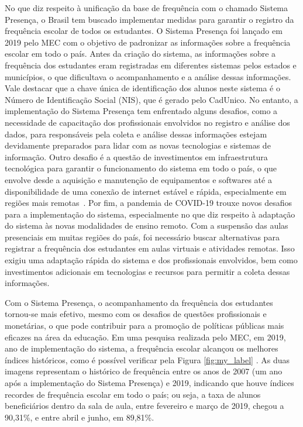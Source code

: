 No que diz respeito à unificação da base de frequência com o chamado Sistema Presença, o Brasil tem buscado implementar medidas para garantir o registro da frequência escolar de todos os estudantes. O Sistema Presença foi lançado em 2019 pelo MEC com o objetivo de padronizar as informações sobre a frequência escolar em todo o país. Antes da criação do sistema, as informações sobre a frequência dos estudantes eram registradas em diferentes sistemas pelos estados e municípios, o que dificultava o acompanhamento e a análise dessas informações. Vale destacar que a chave única de identificação dos alunos neste sistema é o Número de Identificação Social (NIS), que é gerado pelo CadUnico. No entanto, a implementação do Sistema Presença tem enfrentado alguns desafios, como a necessidade de capacitação dos profissionais envolvidos no registro e análise dos dados, para responsáveis pela coleta e análise dessas informações estejam devidamente preparados para lidar com as novas tecnologias e sistemas de informação. Outro desafio é a questão de investimentos em infraestrutura tecnológica para garantir o funcionamento do sistema em todo o país, o que envolve desde a aquisição e manutenção de equipamentos e softwares até a disponibilidade de uma conexão de internet estável e rápida, especialmente em regiões mais remotas~\cite{echazarra2019learning}. Por fim, a pandemia de COVID-19 trouxe novos desafios para a implementação do sistema, especialmente no que diz respeito à adaptação do sistema às novas modalidades de ensino remoto. Com a suspensão das aulas presenciais em muitas regiões do país, foi necessário buscar alternativas para registrar a frequência dos estudantes em aulas virtuais e atividades remotas. Isso exigiu uma adaptação rápida do sistema e dos profissionais envolvidos, bem como investimentos adicionais em tecnologias e recursos para permitir a coleta dessas informações.

Com o Sistema Presença, o acompanhamento da frequência dos estudantes tornou-se mais efetivo, mesmo com os desafios de questões profissionais e monetárias, o que pode contribuir para a promoção de políticas públicas mais eficazes na área da educação. Em uma pesquisa realizada pelo MEC, em 2019, ano de implementação do sistema, a frequência escolar alcançou os melhores índices históricos, como é possível verificar pela Figura \ref{fig:my_label} \cite{historicos2019}. As duas imagens representam o histórico de frequência entre os anos de 2007 (um ano após a implementação do Sistema Presença) e 2019, indicando que houve índices recordes de frequência escolar em todo o país; ou seja, a taxa de alunos beneficiários dentro da sala de aula, entre fevereiro e março de 2019, chegou a 90,31\%, e entre abril e junho, em 89,81\%.


